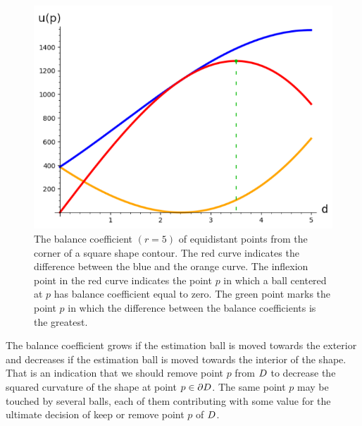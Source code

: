\begin{figure}
\begin{minipage}{0.25\textwidth}
\end{minipage}%
\begin{minipage}{0.75\textwidth}
\includegraphics[scale=0.75]{figures/chapter7/balance-coefficient-p2-with-sum-2.png}
\end{minipage}
\caption{The balance coefficient $(r=5)$ of equidistant points from the corner of a square shape contour. The red curve indicates the difference between the blue and the orange curve. The inflexion point in the red curve indicates the point $p$ in which a ball centered at $p$ has balance coefficient equal to zero. The green point marks the point $p$ in which the difference between the balance coefficients is the greatest. }
\label{fig:balance-plot}
\end{figure}


The balance coefficient grows if the estimation ball is moved towards the exterior and decreases if the estimation ball is moved towards the interior of the shape. That is an indication that we should remove point $p$ from $D$ to decrease the squared curvature of the shape at point $p \in \partial D$. The same point $p$ may be touched by several balls, each of them contributing with some value for the ultimate decision of keep or remove point $p$ of $D$. 


